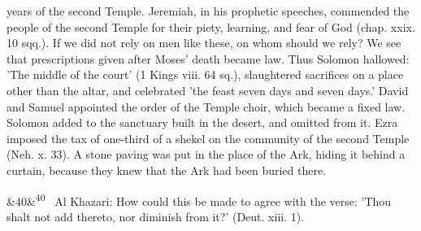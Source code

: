 \documentclass[12pt]{article}
\newcommand{\para}[1][]{\par\noindent\ifx&#1&\else\textsuperscript{\footnotesize #1}~\fi}
\begin{document}
years of the second Temple. Jeremiah, in his prophetic speeches, commended the people of the second Temple for their piety, learning, and fear of God (chap. xxix. 10 sqq.). If we did not rely on men like these, on whom should we rely? We see that prescriptions given after Moses' death became law. Thus Solomon hallowed: 'The middle of the court' (1 Kings viii. 64 sq.), slaughtered sacrifices on a place other than the altar, and celebrated 'the feast seven days and seven days.' David and Samuel appointed the order of the Temple choir, which became a fixed law. Solomon added to the sanctuary built in the desert, and omitted from it. Ezra imposed the tax of one-third of a shekel on the community of the second Temple (Neh. x. 33). A stone paving was put in the place of the Ark, hiding it behind a curtain, because they knew that the Ark had been buried there.

\para[40] Al Khazari: How could this be made to agree with the verse: 'Thou shalt not add thereto, nor diminish from it?' (Deut. xiii. 1).
\end{document}
